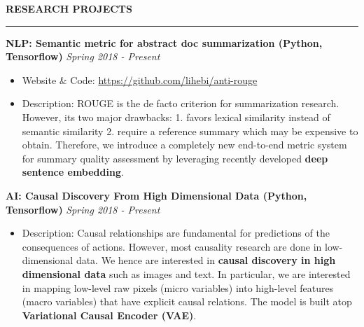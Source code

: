 \documentclass[10pt,letterpaper]{article}
\newenvironment{mysection}[1]{ %
  \medskip
  \MakeUppercase{\bf #1}
  \medskip
  \hrule
  \medskip
  \begin{list}{}{
      \setlength{\leftmargin}{1.5em}
    }
  \item[]
}{
  \end{list}
}
\begin{document}
\begin{mysection}{Research Projects}

  \textbf{NLP: Semantic metric for abstract doc summarization (Python,
    Tensorflow)} \hfill \emph{Spring 2018 - Present}
  \begin{itemize}
  \item Website \& Code: \url{https://github.com/lihebi/anti-rouge}
  \item Description: ROUGE is the de facto criterion for summarization
    research.  However, its two major drawbacks: 1. favors lexical
    similarity instead of semantic similarity 2. require a reference
    summary which may be expensive to obtain.  Therefore, we introduce
    a completely new end-to-end metric system for summary quality
    assessment by leveraging recently developed \textbf{deep sentence
      embedding}.


  \end{itemize}
  
  \textbf{AI: Causal Discovery From High Dimensional Data (Python,
    Tensorflow)} \hfill \emph{Spring 2018 - Present}

  \begin{itemize}
  \item Description: Causal relationships are fundamental for
    predictions of the consequences of actions. However, most
    causality research are done in low-dimensional data. We hence are
    interested in \textbf{causal discovery in high dimensional data}
    such as images and text. In particular, we are interested in
    mapping low-level raw pixels (micro variables) into high-level
    features (macro variables) that have explicit causal relations.
    The model is built atop \textbf{Variational Causal Encoder (VAE)}.
  \end{itemize}
  

\end{mysection}
\end{document}
